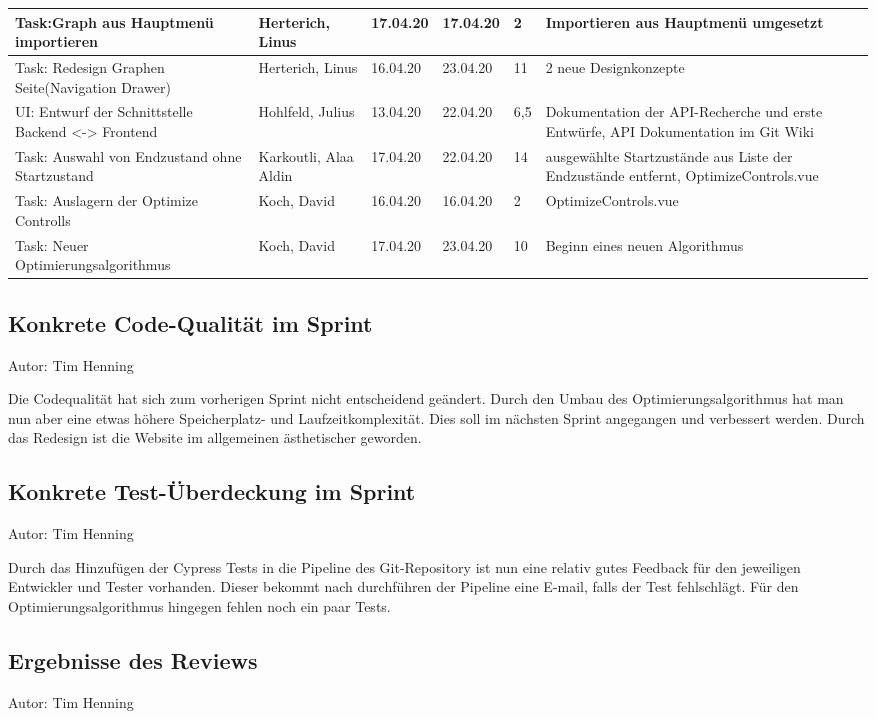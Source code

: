 \begin{longtable}{|p{4cm}|p{2cm}|p{1.2cm}|p{1.2cm}|p{0.7cm}|p{3.8cm}|}
Task:Graph aus Hauptmenü importieren & Herterich, Linus  & 17.04.20  & 17.04.20  & 2 & Importieren aus Hauptmenü umgesetzt  \\ \hline
Task: Redesign Graphen Seite(Navigation Drawer) & Herterich, Linus  & 16.04.20  & 23.04.20 & 11 & 2 neue Designkonzepte \\ \hline
UI: Entwurf der Schnittstelle Backend <-> Frontend & Hohlfeld, Julius  & 13.04.20  & 22.04.20 & 6,5 & Dokumentation der API-Recherche und erste Entwürfe, API Dokumentation im Git Wiki \\ \hline
Task: Auswahl von Endzustand ohne Startzustand & Karkoutli, Alaa Aldin  &  17.04.20 & 22.04.20  & 14 & ausgewählte Startzustände aus Liste der Endzustände entfernt, OptimizeControls.vue  \\ \hline
Task: Auslagern der Optimize Controlls & Koch, David & 16.04.20   & 16.04.20 &  2 & OptimizeControls.vue \\ \hline
Task: Neuer Optimierungsalgorithmus & Koch, David & 17.04.20 & 23.04.20 & 10 & Beginn eines neuen Algorithmus \\ \hline

      \end{longtable}

\subsection{Konkrete Code-Qualität im Sprint}
{\small Autor: Tim Henning}

Die Codequalität hat sich zum vorherigen Sprint nicht entscheidend geändert. Durch den Umbau des Optimierungsalgorithmus hat man nun aber eine etwas höhere Speicherplatz- und Laufzeitkomplexität. Dies soll im nächsten Sprint angegangen und verbessert werden. Durch das Redesign ist die Website im allgemeinen ästhetischer geworden.


\subsection{Konkrete Test-Überdeckung im Sprint}
{\small Autor: Tim Henning}

Durch das Hinzufügen der Cypress Tests in die Pipeline des Git-Repository ist nun eine relativ gutes Feedback für den jeweiligen Entwickler und Tester vorhanden. Dieser bekommt nach durchführen der Pipeline eine E-mail, falls der Test fehlschlägt. Für den Optimierungsalgorithmus hingegen fehlen noch ein paar Tests.

\subsection{Ergebnisse des Reviews}
{\small Autor: Tim Henning}

